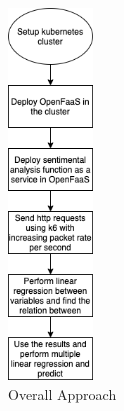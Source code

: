 \begin{figure}[htpb]
  \centering
  \includegraphics[width=0.2\textwidth]{figures/approach}
  \caption{Overall Approach} \label{fig:approach}
\end{figure}





